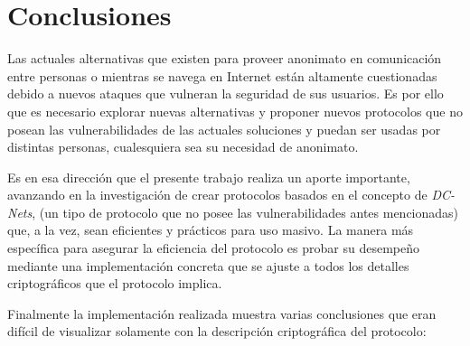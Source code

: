 \chapter{Conclusiones}\label{cap7}

Las actuales alternativas que existen para proveer anonimato en comunicación 
entre personas o mientras se navega en Internet están altamente cuestionadas 
debido a nuevos ataques que vulneran la seguridad de sus usuarios. Es por ello 
que es necesario explorar nuevas alternativas y proponer nuevos protocolos 
que no posean las vulnerabilidades de las actuales soluciones y puedan ser 
usadas por distintas personas, cualesquiera sea su necesidad de anonimato.

Es en esa dirección que el presente trabajo realiza un aporte importante, 
avanzando en la investigación de crear protocolos basados en el concepto de 
\emph{DC-Nets}, (un tipo de protocolo que no posee las vulnerabilidades antes 
mencionadas) que, a la vez, sean eficientes y prácticos para uso masivo. 
La manera más específica para asegurar la eficiencia del protocolo es probar 
su desempeño mediante una implementación concreta que se ajuste a todos los 
detalles criptográficos que el protocolo implica.

Finalmente la implementación realizada muestra varias conclusiones que eran 
difícil de visualizar solamente con la descripción criptográfica del protocolo:

